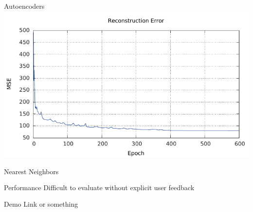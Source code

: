 \documentclass{beamer}
\begin{document}
\begin{frame}{Autoencoders}
\centering
\includegraphics[width=0.8\linewidth]{../paper/error.pdf}
\end{frame}

\begin{frame}{Nearest Neighbors}

\end{frame}

\begin{frame}{Performance}
Difficult to evaluate without explicit user feedback
\end{frame}

\begin{frame}{Demo}
Link or something
\end{frame}

\begin{frame}
\titlepage
\end{frame}
\end{document}

